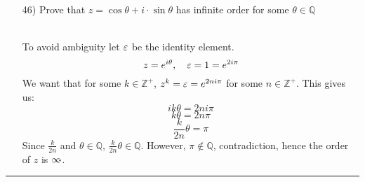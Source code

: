 \documentclass[11pt]{article}
\let\oriinfty=\infty
\def\infty{{\oriinfty\llap{\vrule height.24em depth-.2em width.2em}}}
\begin{document}
\begin{itemize}
\begin{itemize}
    \end{itemize}
    \vspace{6pt}
    \hrule
    \vspace{6pt}
    \item[46)] Prove that $z=\cos\theta + i\cdot \sin\theta$ has infinite order for some $\theta \in \mathbb{Q}$\\
    \begin{solution} \hfill \\
        To avoid ambiguity let $\varepsilon$ be the identity element.
        $$z=e^{i\theta}, \quad \varepsilon=1=e^{2i\pi}$$
        We want that for some $k\in \mathbb{Z}^+$, $z^k=\varepsilon=e^{2ni\pi}$ for some $n\in \mathbb{Z}^+$. This gives us:
        $$ik\theta=2ni\pi$$
        $$k\theta=2n\pi$$
        $$\frac{k}{2n}\theta=\pi$$
        Since $\frac{k}{2n}$ and $\theta \in \mathbb{Q}$, $\frac{k}{2n}\theta \in \mathbb{Q}$. However, $\pi \notin \mathbb{Q}$, contradiction,
        hence the order of $z$ is $\infty$.
    \end{solution}
\end{itemize}
\vspace{6pt}
\hrule
\vspace{6pt}
\end{document}
